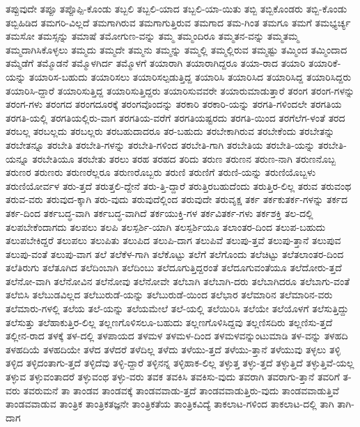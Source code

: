 {ತಪ್ಪುವುದೇ
ತಪ್ಪೂ
ತಪ್ಪೊಪ್ಪಿ-ಕೊಂಡು
ತಬ್ಬಲಿ
ತಬ್ಬಲಿ-ಯಾದ
ತಬ್ಬಲಿ-ಯಾ-ಯಿತು
ತಬ್ಬಿ
ತಬ್ಬಿಕೊಂಡರು
ತಬ್ಬಿ-ಕೊಂಡು
ತಬ್ಬಿಹಿಡಿದ
ತಮಗರಿ-ವಿಲ್ಲದೆ
ತಮಗಾಗಿರುವ
ತಮಗಾಗುತ್ತಿರುವ
ತಮಗಾದ
ತಮ-ಗಿಂತ
ತಮಗೂ
ತಮಗೆ
ತಮಭ್ಯರ್ಚ್ಯ
ತಮಸೋ
ತಮಸ್ಸನ್ನು
ತಮಾಷೆ
ತಮೋಗುಣ-ವನ್ನು
ತಮ್ಮ
ತಮ್ಮಂದಿರೂ
ತಮ್ಮತನ-ವನ್ನು
ತಮ್ಮತಮ್ಮ
ತಮ್ಮದಾಗಿಸಿಕೊಳ್ಳಲು
ತಮ್ಮದು
ತಮ್ಮದೇ
ತಮ್ಮನು
ತಮ್ಮನ್ನು
ತಮ್ಮಲ್ಲಿ
ತಮ್ಮಲ್ಲಿರುವ
ತಮ್ಮಷ್ಟು
ತಮ್ಮಿಂದ
ತಮ್ಮಿಂದಾದ
ತಮ್ಮೆಡೆಗೆ
ತಮ್ಮೊಡನೆ
ತಮ್ಮೊಳಗಿರ್ದ
ತಮ್ಮೊಳಗೆ
ತಯಾರಾಗಿ
ತಯಾರಾಗಿದ್ದರೂ
ತಯಾ-ರಾದ
ತಯಾರಿ
ತಯಾರಿಕೆ-ಯನ್ನು
ತಯಾರಿಸ-ಬಹುದು
ತಯಾರಿಸಲು
ತಯಾರಿಸಲ್ಪಡುತ್ತಿದ್ದ
ತಯಾರಿಸಿ
ತಯಾರಿಸಿದ
ತಯಾರಿಸಿದ್ದ
ತಯಾರಿಸಿದ್ದರು
ತಯಾರಿಸಿ-ದ್ದಾರೆ
ತಯಾರಿಸುತ್ತಿದ್ದ
ತಯಾರಿಸುತ್ತಿದ್ದರು
ತಯಾರಿಸುವವರೇ
ತಯಾರುಮಾಡುತ್ತಾರೆ
ತರಂಗ
ತರಂಗ-ಗಳನ್ನು
ತರಂಗ-ಗಳು
ತರಂಗದ
ತರಂಗದೂರಕ್ಕೆ
ತರಂಗವೊಂದನ್ನು
ತರಕಾರಿ
ತರಕಾರಿ-ಯನ್ನು
ತರಗತಿ-ಗಳಿಂದಲೇ
ತರಗತಿಯ
ತರಗತಿ-ಯಲ್ಲಿ
ತರಗತಿಯಲ್ಲಿರು-ವಾಗ
ತರಗತಿಯ-ವರೆಗೆ
ತರಗತಿಯಷ್ಟರದು
ತರಗತಿ-ಯಿಂದ
ತರಗೆಲೆಗ-ಳಂತೆ
ತರದ
ತರಬಲ್ಲ
ತರಬಲ್ಲದು
ತರಬಲ್ಲರು
ತರಬಹುದಾದರೂ
ತರ-ಬಹುದು
ತರಬೇಕಾಗಿರುವ
ತರಬೇಕೆಂದು
ತರಬೇತನ್ನು
ತರಬೇತನ್ನೂ
ತರಬೇತಿ
ತರಬೇತಿ-ಗಳನ್ನು
ತರಬೇತಿ-ಗಳಿಂದ
ತರಬೇತಿ-ಗಾಗಿ
ತರಬೇತಿಯ
ತರಬೇತಿ-ಯನ್ನು
ತರಬೇತಿ-ಯನ್ನೂ
ತರಬೇತಿಯೂ
ತರಬೇತು
ತರಲು
ತರಹ
ತರಹದ
ತರಿದು
ತರುಣ
ತರುಣನ
ತರುಣ-ನಾಗಿ
ತರುಣನೊಬ್ಬ
ತರುಣರ
ತರುಣರು
ತರುಣರೆಲ್ಲರೂ
ತರುಣರೊಬ್ಬರು
ತರುಣಿ
ತರುಣಿಗೆ
ತರುಣಿ-ಯನ್ನು
ತರುಣಿಯೊಬ್ಬಳು
ತರುಣಿಯೋರ್ವಳ
ತರು-ತ್ತದೆ
ತರುತ್ತಲಿ-ದ್ದೇನೆ
ತರು-ತ್ತಿ-ದ್ದಾರೆ
ತರುತ್ತಿರಬಹುದೆಂದು
ತರುತ್ತಿರ-ಲಿಲ್ಲ
ತರುವ
ತರುವಂಥ
ತರುವ-ವರು
ತರುವುದ-ಕ್ಕಾಗಿ
ತರು-ವುದು
ತರುವುದೆಲ್ಲಿಂದ
ತರುವುದೇ
ತರುವೃಕ್ಷ
ತರ್ಕ
ತರ್ಕಕುತರ್ಕ-ಗಳನ್ನು
ತರ್ಕದ
ತರ್ಕ-ದಿಂದ
ತರ್ಕಬದ್ಧ-ವಾಗಿ
ತರ್ಕಬದ್ಧ-ವಾಗಿದೆ
ತರ್ಕಯುಕ್ತಿ-ಗಳ
ತರ್ಕವಿತರ್ಕ-ಗಳು
ತರ್ಕಶಕ್ತಿ
ತಲ-ದಲ್ಲಿ
ತಲಪಬೇಕೆಂದಾಗದು
ತಲಪಲು
ತಲಪಿ
ತಲಸ್ಪರ್ಶಿ-ಯಾಗಿ
ತಲಸ್ಪರ್ಶಿಯೂ
ತಲಾಂತರ-ದಿಂದ
ತಲುಪ-ಬಹುದು
ತಲುಪಬೇಕಿದ್ದರೆ
ತಲುಪಲು
ತಲುಪಿತು
ತಲುಪಿದ
ತಲುಪಿ-ದಾಗ
ತಲುಪಿವೆ
ತಲುಪು-ತ್ತವೆ
ತಲುಪು-ತ್ತಾನೆ
ತಲುಪುವ
ತಲುಪು-ವಂತೆ
ತಲುಪು-ವಾಗ
ತಲೆ
ತಲೆಕೆಳ-ಗಾಗಿ
ತಲೆಕೊಟ್ಟು
ತಲೆಗೆ
ತಲೆಗೊಂದು
ತಲೆಚಿಟ್ಟು
ತಲೆತಲಾಂತರ-ದಿಂದ
ತಲೆತಿರುಗು
ತಲೆತೂಗಿದ
ತಲೆದಿಂಬಾಗಿ
ತಲೆದಿಂಬು
ತಲೆದೂಗುತ್ತಿದ್ದರಂತೆ
ತಲೆದೂಗುವಂತೆಯೂ
ತಲೆದೋರು-ತ್ತದೆ
ತಲೆನೋ-ವಾಗಿ
ತಲೆನೋವಿನ
ತಲೆನೋವು
ತಲೆನೋವೇ
ತಲೆಬಾಗಿ
ತಲೆಬಾಗಿ-ದರು
ತಲೆಬಾಗಿದರೂ
ತಲೆಬಾಗು-ವಂತೆ
ತಲೆಬಿಸಿ
ತಲೆಬುಡವಿಲ್ಲದ
ತಲೆಬುರುಡೆ-ಯನ್ನು
ತಲೆಬುರುಡೆ-ಯಿಂದ
ತಲೆಭಾರ
ತಲೆಮಾರಿನ
ತಲೆಮಾರಿನ-ವರು
ತಲೆಮಾರು-ಗಳಲ್ಲಿ
ತಲೆಯ
ತಲೆ-ಯನ್ನು
ತಲೆಯಮೇಲೆ
ತಲೆ-ಯಲ್ಲಿ
ತಲೆಯಿರಿಸಿ
ತಲೆಯೇ
ತಲೆಯೊಳಗೆ
ತಲೆಸುತ್ತಿದ್ದು
ತಲೆಸುತ್ತು
ತಲೆಹಾಕುತ್ತಿರ-ಲಿಲ್ಲ
ತಲ್ಲಣಗೊಳಿಸಲೂ-ಬಹುದು
ತಲ್ಲಣಗೊಳಿಸಿದ್ದವು
ತಲ್ಲಣಿಸದಿರು
ತಲ್ಲಣಿಸು-ತ್ತದೆ
ತಲ್ಲೀನ-ರಾದ
ತಳಕ್ಕೆ
ತಳ-ದಲ್ಲಿ
ತಳಪಾಯದ
ತಳಮಳ
ತಳಮಳ-ದಿಂದ
ತಳಮಳವನ್ನುಂಟುಮಾಡಿ
ತಳ-ವನ್ನು
ತಳಹದಿ
ತಳಹದಿಯೆ
ತಳಹದಿಯೇ
ತಳೆದ
ತಳೆದರೆ
ತಳೆದಿಲ್ಲ
ತಳೆದು
ತಳೆಯು-ತ್ತದೆ
ತಳೆಯು-ತ್ತಾನೆ
ತಳೆಯುವು
ತಳ್ಳಲು
ತಳ್ಳಿ
ತಳ್ಳಿದ
ತಳ್ಳಿದಂತಾಗು-ತ್ತದೆ
ತಳ್ಳಿದೆವು
ತಳ್ಳಿ-ದ್ದಾರೆ
ತಳ್ಳಿನನ್ನ
ತಳ್ಳಿಹಾಕ-ಲಿಲ್ಲ
ತಳ್ಳುತ್ತ
ತಳ್ಳು-ತ್ತದೆ
ತಳ್ಳುತ್ತಿದೆ
ತಳ್ಳುತ್ತಿವೆ-ಯಲ್ಲ
ತಳ್ಳುವ
ತಳ್ಳುವಂತಾದರೆ
ತಳ್ಳುವಂಥ
ತಳ್ಳು-ವರು
ತವಕ
ತವಕಿಸಿ
ತವಕಿಸು-ವುದು
ತವರಾಗಿ
ತವರಾಗು-ತ್ತಾನೆ
ತವರಿಗೆ
ತ-ವರು
ತವರುಮನೆ
ತಾ
ತಾಂಡವ
ತಾಂಡವಕ್ಕೆ
ತಾಂಡವವಾಡು-ತ್ತದೆ
ತಾಂಡವವಾಡುತ್ತಿರು-ವುದು
ತಾಂಡವವಾಡುತ್ತಿವೆ
ತಾಂಡವವಾಡುವ
ತಾಂತ್ರಿಕ
ತಾಂತ್ರಿಕತಜ್ಞನೇ
ತಾಂತ್ರಿಕತೆಯ
ತಾಂತ್ರಿಕವಿದ್ಯೆ
ತಾಕಲಾಟ-ಗಳಿಂದ
ತಾಕಲಾಟ-ದಲ್ಲಿ
ತಾಗಿ
ತಾಗಿ-ದಾಗ
}
